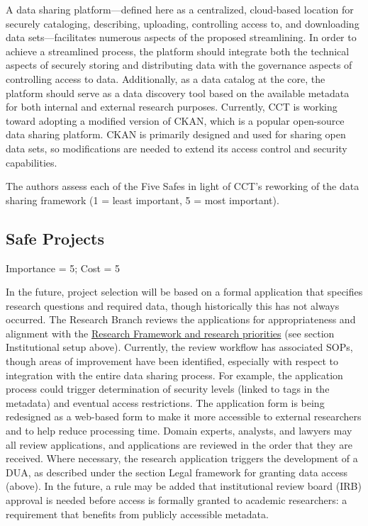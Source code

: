 A data sharing platform---defined here as a centralized, cloud-based location for securely cataloging, describing, uploading, controlling access to, and downloading data sets---facilitates numerous aspects of the proposed streamlining. In order to achieve a streamlined process, the platform should integrate both the technical aspects of securely storing and distributing data with the governance aspects of controlling access to data. Additionally, as a data catalog at the core, the platform should serve as a data discovery tool based on the available metadata for both internal and external research purposes. Currently, CCT is working toward adopting a modified version of CKAN, which is a popular open-source data sharing platform. CKAN is primarily designed and used for sharing open data sets, so modifications are needed to extend its access control and security capabilities.

The authors assess each of the Five Safes in light of CCT's reworking of the data sharing framework (1 = least important, 5 = most important).

\hypertarget{safe-projects-5}{%
\subsection{Safe Projects}\label{safe-projects-5}}

Importance = 5; Cost = 5

In the future, project selection will be based on a formal application that specifies research questions and required data, though historically this has not always occurred. The Research Branch reviews the applications for appropriateness and alignment with the \href{http://osf.io/2a7ev}{Research Framework and research priorities} (see section Institutional setup above). Currently, the review workflow has associated SOPs, though areas of improvement have been identified, especially with respect to integration with the entire data sharing process. For example, the application process could trigger determination of security levels (linked to tags in the metadata) and eventual access restrictions. The application form is being redesigned as a web-based form to make it more accessible to external researchers and to help reduce processing time. Domain experts, analysts, and lawyers may all review applications, and applications are reviewed in the order that they are received. Where necessary, the research application triggers the development of a DUA, as described under the section Legal framework for granting data access (above). In the future, a rule may be added that institutional review board (IRB) approval is needed before access is formally granted to academic researchers: a requirement that benefits from publicly accessible metadata.

